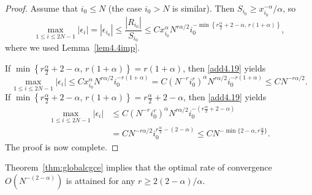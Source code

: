 \documentclass[smallextended]{svjour3}       %
\begin{document}
\begin{proof}
Assume that  $i_{0}\leq N$ (the case $i_{0}> N$ is similar).
Then $S_{i_{0}} \geq  x_{i_{0}}^{-\alpha}/\alpha$, so
\begin{equation}\label{add4.19}
\max_{1\leq i \leq 2N-1} |\epsilon_{i}| = |\epsilon_{i_{0}}| \leq \frac{|R_{i_{0}}|}{S_{i_{0}}}
	\leq C x_{i_{0}}^{\alpha}  N^{r\alpha/2} i_{0}^{-\min\left\{r\frac{\alpha}{2}+2-\alpha,\,r(1+\alpha)\right\}},
\end{equation}
where we used 	Lemma~\ref{lem4.4imp}.
	
If $\min\left\{r\frac{\alpha}{2}+2-\alpha,\,r(1+\alpha)\right\}= r(1+ \alpha)$, then \eqref{add4.19} yields 
\begin{equation*}
\max_{1\leq i \leq 2N-1} |\epsilon_{i}| \leq C x_{i_{0}}^{\alpha}  N^{r\alpha/2} i_{0}^{-r(1+\alpha)}
		= C  (N^{-r}i_{0}^{r})^{\alpha}  N^{r\alpha/2} i_{0}^{-r(1+\alpha) }
		\leq C  N^{-r\alpha/2}.
\end{equation*}
If $\min\left\{r\frac{\alpha}{2}+2-\alpha,\,r(1+\alpha)\right\}= r\frac{\alpha}{2}+2-\alpha $, then \eqref{add4.19} yields
\begin{equation*}
\begin{split}
   \max_{1\leq i \leq 2N-1} |\epsilon_{i}| & \le C (N^{-r}i_{0}^{r})^{\alpha}  N^{r\alpha/2} i_{0}^{-\left(r\frac{\alpha}{2}+2-\alpha\right)} \\
     & = C N^{-r\alpha/2} i_{0}^{r\frac{\alpha}{2}-(2-\alpha)} 
\le C N^{-\min\{2-\alpha,r\frac{\alpha}{2}\}}.
\end{split}
\end{equation*}
The proof is now complete.
\end{proof}

\begin{remark}\label{rem:roptimal}
Theorem~\ref{thm:globalcgce} implies that the optimal rate of convergence %
 $O(N^{-(2-\alpha)})$ is attained for any $r\ge 2(2-\alpha)/\alpha$.
\end{remark}
\end{document}
